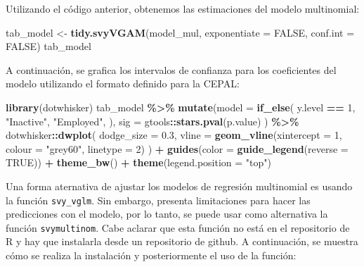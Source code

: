 \documentclass[
  spanish,
  12pt,
]{book}
\newenvironment{Shaded}{\begin{snugshade}}{\end{snugshade}}
\newcommand{\AttributeTok}[1]{\textcolor[rgb]{0.13,0.29,0.53}{#1}}
\newcommand{\ConstantTok}[1]{\textcolor[rgb]{0.56,0.35,0.01}{#1}}
\newcommand{\DecValTok}[1]{\textcolor[rgb]{0.00,0.00,0.81}{#1}}
\newcommand{\FloatTok}[1]{\textcolor[rgb]{0.00,0.00,0.81}{#1}}
\newcommand{\FunctionTok}[1]{\textcolor[rgb]{0.13,0.29,0.53}{\textbf{#1}}}
\newcommand{\NormalTok}[1]{#1}
\newcommand{\OtherTok}[1]{\textcolor[rgb]{0.56,0.35,0.01}{#1}}
\newcommand{\SpecialCharTok}[1]{\textcolor[rgb]{0.81,0.36,0.00}{\textbf{#1}}}
\newcommand{\StringTok}[1]{\textcolor[rgb]{0.31,0.60,0.02}{#1}}
\begin{document}
Utilizando el código anterior, obtenemos las estimaciones del modelo multinomial:

\begin{Shaded}
\begin{Highlighting}[]
\NormalTok{tab\_model }\OtherTok{\textless{}{-}} \FunctionTok{tidy.svyVGAM}\NormalTok{(model\_mul, }
                               \AttributeTok{exponentiate =} \ConstantTok{FALSE}\NormalTok{, }
                               \AttributeTok{conf.int =} \ConstantTok{FALSE}\NormalTok{) }
\NormalTok{tab\_model}
\end{Highlighting}
\end{Shaded}

A continuación, se grafica los intervalos de confianza para los coeficientes del modelo utilizando el formato definido para la CEPAL:

\begin{Shaded}
\begin{Highlighting}[]
\FunctionTok{library}\NormalTok{(dotwhisker)}
\NormalTok{tab\_model }\SpecialCharTok{\%\textgreater{}\%} 
  \FunctionTok{mutate}\NormalTok{(}\AttributeTok{model =} \FunctionTok{if\_else}\NormalTok{(}
\NormalTok{      y.level }\SpecialCharTok{==} \DecValTok{1}\NormalTok{, }
      \StringTok{"Inactive"}\NormalTok{,}
      \StringTok{"Employed"}\NormalTok{, ),}
    \AttributeTok{sig =}\NormalTok{ gtools}\SpecialCharTok{::}\FunctionTok{stars.pval}\NormalTok{(p.value)}
\NormalTok{  )  }\SpecialCharTok{\%\textgreater{}\%} 
\NormalTok{  dotwhisker}\SpecialCharTok{::}\FunctionTok{dwplot}\NormalTok{(}
    \AttributeTok{dodge\_size =} \FloatTok{0.3}\NormalTok{,}
    \AttributeTok{vline =} \FunctionTok{geom\_vline}\NormalTok{(}\AttributeTok{xintercept =} \DecValTok{1}\NormalTok{, }\AttributeTok{colour =} \StringTok{"grey60"}\NormalTok{,}
                       \AttributeTok{linetype =} \DecValTok{2}\NormalTok{)}
\NormalTok{  ) }\SpecialCharTok{+} 
  \FunctionTok{guides}\NormalTok{(}\AttributeTok{color =} \FunctionTok{guide\_legend}\NormalTok{(}\AttributeTok{reverse =} \ConstantTok{TRUE}\NormalTok{)) }\SpecialCharTok{+} 
  \FunctionTok{theme\_bw}\NormalTok{() }\SpecialCharTok{+} \FunctionTok{theme}\NormalTok{(}\AttributeTok{legend.position =} \StringTok{"top"}\NormalTok{)}
\end{Highlighting}
\end{Shaded}

Una forma aternativa de ajustar los modelos de regresión multinomial es usando la función \texttt{svy\_vglm}. Sin embargo, presenta limitaciones para hacer las predicciones con el modelo, por lo tanto, se puede usar como alternativa la función \texttt{svymultinom}. Cabe aclarar que esta función no está en el repositorio de R y hay que instalarla desde un repositorio de github. A continuación, se muestra cómo se realiza la instalación y posteriormente el uso de la función:
\end{document}
